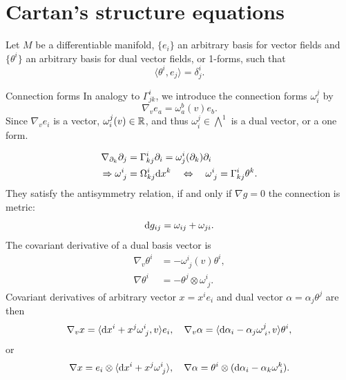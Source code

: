 \section{Cartan's structure equations}
Let $M$ be a differentiable manifold, $\{e_i\}$ an arbitrary basis for vector fields and $\{\theta^i\}$ an arbitrary basis for dual vector fields, or 1-forms, such that 
\begin{equation}
	\langle \theta^i,e_j\rangle = \delta^i_j.
\end{equation}
\begin{mybox}{Connection forms}
	In analogy to $\Gamma^i_{jk}$, we introduce the connection forms $\omega^j_i$ by
	\begin{equation}
		\nabla_v e_a = \omega^b_a(v) e_b.
	\end{equation}
	Since $\nabla_v e_i$ is a vector, $\omega^j_i(v) \in \mathbb{R}$, and thus $\omega^j_i \in \bigwedge^1$ is a dual vector, or a one form.
\end{mybox}
\begin{align}
	\nabla_{\partial_k} \partial_j &=\Gamma^i_{kj} \partial_i = \omega^i_j(\partial_k)\partial_i \nonumber \\
	\Rightarrow \omega^i_{\;j} &= \Omega^i_{kj} \mathrm{d} x^k \quad \Leftrightarrow \quad \omega^i_{\;j} = \Gamma^i_{kj} \theta^k.
\end{align}
They satisfy the antisymmetry relation, if and only if $\nabla g=0$ the connection is metric:
\begin{equation}
	\mathrm{d} g_{ij} = \omega_{ij} + \omega_{ji}.
\end{equation}
The covariant derivative of a dual basis vector is
\begin{align}
	\nabla_v \theta^i &= - \omega^i_{\;j} (v) \theta^i,\\
	\nabla \theta^i &= - \theta^j \otimes \omega^i_{\;j}.
\end{align}
Covariant derivatives of arbitrary vector $x=x^i e_i$ and dual vector $\alpha=\alpha_j \theta^j$ are then
\begin{equation}
	\nabla_v x = \langle \mathrm{d} x^i + x^j \omega^i_{\;j}, v\rangle e_i, \quad \nabla_v \alpha = \langle \mathrm{d} \alpha_i - \alpha_j \omega^j_{\; i},  v\rangle \theta^i,
\end{equation}
or
\begin{equation}
	\nabla x = e_i \otimes \langle \mathrm{d} x^i+x^j \omega^i_{\;j}\rangle, \quad \nabla \alpha = \theta^i \otimes (\mathrm{d} \alpha_i - \alpha_k \omega^k_{\;i}).
\end{equation}

